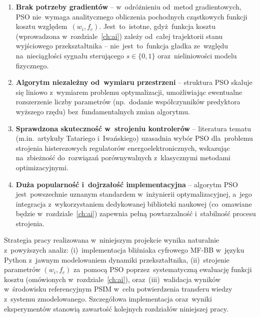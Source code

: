 \begin{enumerate}
    \item \textbf{Brak potrzeby gradientów} -- w~odróżnieniu od~metod gradientowych, PSO nie~wymaga analitycznego obliczenia pochodnych cząstkowych funkcji kosztu względem~$(w_i, f_c)$. Jest~to~istotne, gdyż~funkcja kosztu (wprowadzona w~rozdziale~\ref{ch:ai}) zależy od~całej trajektorii stanu wyjściowego przekształtnika -- nie~jest~to~funkcja gładka ze~względu na~nieciągłości sygnału sterującego $s\in\{0,1\}$ oraz~nieliniowości modelu fizycznego.
    
    \item \textbf{Algorytm niezależny od~wymiaru przestrzeni} -- struktura PSO skaluje się liniowo z~wymiarem problemu optymalizacji, umożliwiając ewentualne rozszerzenie liczby parametrów (np.~dodanie współczynników predyktora wyższego rzędu) bez~fundamentalnych zmian algorytmu.
    
    \item \textbf{Sprawdzona skuteczność w~strojeniu kontrolerów} -- literatura tematu (m.in.~artykuły Tatariego i~Iwańskiego) uzasadnia wybór PSO dla~problemu strojenia histerezowych regulatorów energoelektronicznych, wskazując na~zbieżność do~rozwiązań porównywalnych z~klasycznymi metodami optimizacyjnymi.
    
    \item \textbf{Duża popularność i~dojrzałość implementacyjna} -- algorytm PSO jest~powszechnie uznanym standardem w~inżynierii optymalizacyjnej, a~jego integracja z~wykorzystaniem dedykowanej biblioteki naukowej (co~omawiane będzie w~rozdziale~\ref{ch:ai}) zapewnia pełną powtarzalność i~stabilność procesu strojenia.
\end{enumerate}

Strategia pracy realizowana w~niniejszym projekcie wynika naturalnie z~powyższych analiz: (i)~implementacja bliźniaka cyfrowego MF-BB w~języku Python z~jawnym modelowaniem dynamiki przekształtnika, (ii)~strojenie parametrów $(w_i, f_c)$ za~pomocą PSO poprzez~systematyczną ewaluację funkcji kosztu (omówionych w~rozdziale~\ref{ch:ai}), oraz~(iii)~walidacja wyników w~środowisku referencyjnym PSIM w~celu potwierdzenia transferu wiedzy z~systemu zmodelowanego. Szczegółowa implementacja oraz~wyniki eksperymentów stanowią zawartość kolejnych rozdziałów niniejszej pracy.
